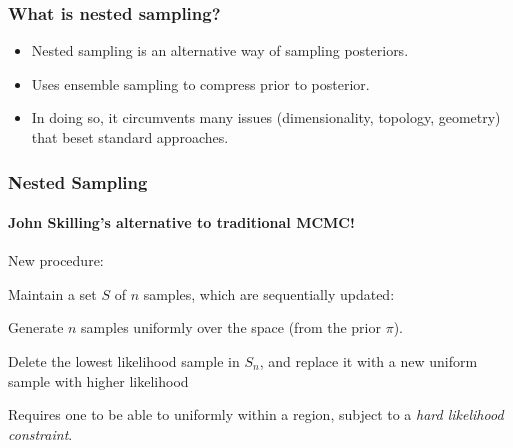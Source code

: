 \documentclass[%
]{beamer}
\newcommand{\prior}{\pi}
\begin{document}
\begin{frame}
  \frametitle{What is nested sampling?}
  \begin{itemize}
    \pause\item Nested sampling is an alternative way of sampling posteriors. 
    \pause\item Uses ensemble sampling to compress prior to posterior.
    \pause\item In doing so, it circumvents many issues (dimensionality, topology, geometry) that beset standard approaches.
  \end{itemize}
\end{frame}


\begin{frame}
  \frametitle{Nested Sampling} 
  \framesubtitle{John Skilling's alternative to traditional MCMC!} 

  \pause
  New procedure: 

  \pause
  Maintain a set $S$ of $n$ samples, which are sequentially updated:

  \begin{description}
      \pause
    \item[$S_0$:] Generate $n$ samples uniformly over the space (from the prior $\prior$). 
      \pause
    \item[$S_{n+1}$:] Delete the lowest likelihood sample in $S_{n}$, and replace it with a new uniform sample with higher likelihood
  \end{description}

  \pause
  Requires one to be able to uniformly within a region, subject to a {\em hard likelihood constraint}.

\end{frame}





\end{document}
